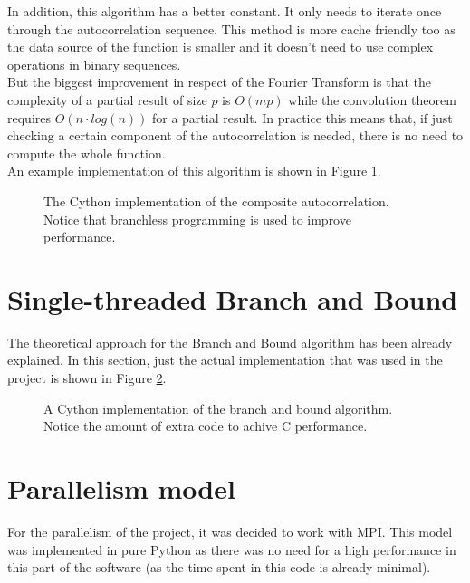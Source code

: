       In addition, this algorithm has a better constant. It only needs to
      iterate once through the autocorrelation sequence. This method is more
      cache friendly too as the data source of the function is smaller and it
      doesn't need to use complex operations in binary sequences.\\

      But the biggest improvement in respect of the Fourier Transform is that
      the complexity of a partial result of size $p$ is $O(mp)$ while the
      convolution theorem requires $O(n \cdot log(n))$ for a partial result. In
      practice this means that, if just checking a certain component
      of the autocorrelation is needed, there is no need to compute the whole
      function.\\

      An example implementation of this algorithm is shown in Figure
      \ref{composite_auto:fig:1}.

      \begin{figure}[ht!]
        \caption{The Cython implementation of the composite autocorrelation.
        Notice that branchless programming is used to improve performance.}
        \label{composite_auto:fig:1}
      \end{figure}

  \section{Single-threaded Branch and Bound}

  The theoretical approach for the Branch and Bound algorithm has been already
  explained. In this section, just the actual implementation that was used
  in the project is shown in Figure \ref{composite_auto:fig:2}.

  \begin{figure}[ht!]
    \caption{A Cython implementation of the branch and bound algorithm. Notice
    the amount of extra code to achive C performance.}
    \label{composite_auto:fig:2}
  \end{figure}


  \section{Parallelism model}

  For the parallelism of the project, it was decided to work with MPI. This model
  was implemented in pure Python as there was no need for a high performance in
  this part of the software (as the time spent in this code is already
  minimal).\\

